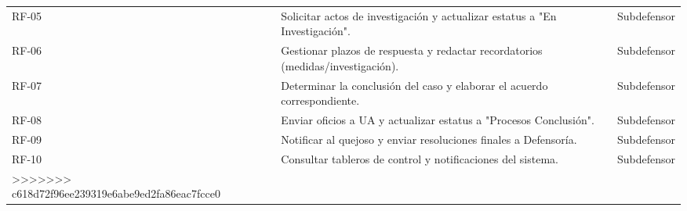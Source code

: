 \begin{table}[h!]
\begin{tabular}{@{} l p{9.5cm} l @{}}
\rowcolor[HTML]{F2F4F7} 
RF-05 & Solicitar actos de investigación y actualizar estatus a "En Investigación". & Subdefensor \\
RF-06 & Gestionar plazos de respuesta y redactar recordatorios (medidas/investigación). & Subdefensor \\
\rowcolor[HTML]{F2F4F7} 
RF-07 & Determinar la conclusión del caso y elaborar el acuerdo correspondiente. & Subdefensor \\
RF-08 & Enviar oficios a UA y actualizar estatus a "Procesos Conclusión". & Subdefensor \\
\rowcolor[HTML]{F2F4F7} 
RF-09 & Notificar al quejoso y enviar resoluciones finales a Defensoría. & Subdefensor \\
RF-10 & Consultar tableros de control y notificaciones del sistema. & Subdefensor \\ \bottomrule
>>>>>>> c618d72f96ee239319e6abe9ed2fa86eac7fcce0
\end{tabular}
\end{table}